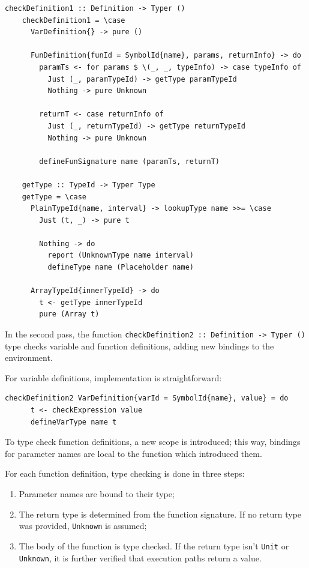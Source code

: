 \documentclass[UdineBachThesis,american,11pt]{PhdThesis}
\begin{document}
  \begin{Verbatim}[gobble=4,fontsize=\small]
    checkDefinition1 :: Definition -> Typer ()
    checkDefinition1 = \case
      VarDefinition{} -> pure ()

      FunDefinition{funId = SymbolId{name}, params, returnInfo} -> do
        paramTs <- for params $ \(_, _, typeInfo) -> case typeInfo of
          Just (_, paramTypeId) -> getType paramTypeId
          Nothing -> pure Unknown

        returnT <- case returnInfo of
          Just (_, returnTypeId) -> getType returnTypeId
          Nothing -> pure Unknown

        defineFunSignature name (paramTs, returnT)

    getType :: TypeId -> Typer Type
    getType = \case
      PlainTypeId{name, interval} -> lookupType name >>= \case
        Just (t, _) -> pure t

        Nothing -> do
          report (UnknownType name interval)
          defineType name (Placeholder name)

      ArrayTypeId{innerTypeId} -> do
        t <- getType innerTypeId
        pure (Array t)
  \end{Verbatim}

  In the second pass, the function
  \mbox{\texttt{checkDefinition2 :: Definition -> Typer ()}} type checks
  variable and function definitions, adding new bindings to the environment.

  For variable definitions, implementation is straightforward:

  \begin{Verbatim}[gobble=4,fontsize=\small]
    checkDefinition2 VarDefinition{varId = SymbolId{name}, value} = do
      t <- checkExpression value
      defineVarType name t
  \end{Verbatim}

  To type check function definitions, a new scope is introduced; this way,
  bindings for parameter names are local to the function which introduced them.

  For each function definition, type checking is done in three steps:

  \begin{enumerate}
    \item Parameter names are bound to their type;

    \item The return type is determined from the function signature. If no
    return type was provided, \mbox{\texttt{Unknown}} is assumed;

    \item The body of the function is type checked. If the return type isn't
    \mbox{\texttt{Unit}} or \mbox{\texttt{Unknown}}, it is further verified that
    execution paths return a value.
  \end{enumerate}
\end{document}
